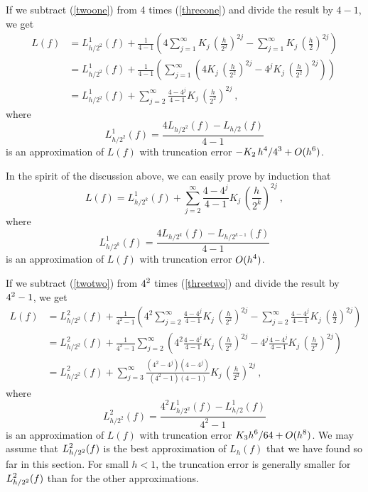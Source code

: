 If we subtract (\ref{twoone}) from 4 times (\ref{threeone}) and divide
the result by $4-1$, we get
\begin{align}
L(f) &= L_{h/2^2}^1(f) + \frac{1}{4-1}\left(
4 \sum_{j=1}^\infty K_j\,\left(\frac{h}{2^2}\right)^{2j}
- \sum_{j=1}^\infty K_j\,\left(\frac{h}{2}\right)^{2j}\right) \nonumber \\
&= L_{h/2^2}^1(f) + \frac{1}{4-1}\left(
\sum_{j=1}^\infty \left( 4 K_j\,\left(\frac{h}{2^2}\right)^{2j}
- 4^j K_j\,\left(\frac{h}{2^2}\right)^{2j}\right) \right) \nonumber \\
&= L_{h/2^2}^1(f) + \sum_{j=2}^\infty \frac{4 - 4^j}{4-1} K_j\,
\left(\frac{h}{2^2}\right)^{2j} \ ,  \label{threetwo}
\end{align}
where
\[
L_{h/2^2}^1(f) = \frac{4L_{h/2^2}(f)-L_{h/2}(f)}{4-1}
\]
is an approximation of $L(f)$ with truncation error
$\displaystyle - K_2\,h^4/4^3 + O(h^6)$.

In the spirit of the discussion above, we can easily prove by
induction that
\begin{equation} \label{ntwo}
L(f) = L_{h/2^k}^1(f) + \sum_{j=2}^\infty \frac{4 - 4^j}{4-1} K_j\,
\left(\frac{h}{2^k}\right)^{2j} \ ,
\end{equation}
where
\[
L_{h/2^k}^1(f) = \frac{4L_{h/2^k}(f)-L_{h/2^{k-1}}(f)}{4-1}
\]
is an approximation of $L(f)$ with truncation error $\displaystyle O(h^4)$.

If we subtract (\ref{twotwo}) from $\displaystyle 4^2$ times
(\ref{threetwo}) and divide the result by $\displaystyle 4^2-1$, we get
\begin{align}
L(f) &= L_{h/2^2}^2(f) + \frac{1}{4^2-1}\left(
4^2 \sum_{j=2}^\infty \frac{4 - 4^j}{4-1} K_j\,
\left(\frac{h}{2^2}\right)^{2j} -
\sum_{j=2}^\infty \frac{4 - 4^j}{4-1} K_j\,
\left(\frac{h}{2}\right)^{2j} \right) \nonumber \\
&= L_{h/2^2}^2(f) + \frac{1}{4^2-1} \sum_{j=2}^\infty \left(
4^2 \frac{4 - 4^j}{4-1} K_j\, \left(\frac{h}{2^2}\right)^{2j}
- 4^j \frac{4 - 4^j}{4-1} K_j\, \left(\frac{h}{2^2}\right)^{2j}
\right) \nonumber \\
&= L_{h/2^2}^2(f) + \sum_{j=3}^\infty
\frac{(4^2-4^j)(4-4^j)}{(4^2-1)(4-1)}
K_j\, \left(\frac{h}{2^2}\right)^{2j} \ ,  \label{threethree}
\end{align}
where
\[
L_{h/2^2}^2(f) = \frac{4^2L_{h/2^2}^1(f)
  -L_{h/2}^1(f)}{4^2-1}
\]
is an approximation of $L(f)$ with truncation error
$\displaystyle K_3 h^6/64 + O(h^8)$.  We may assume 
that $\displaystyle L_{h/2^2}^2(f)$ is the best approximation of
$L_h(f)$ that we have found so far in this section.  For small $h<1$,
the truncation error is generally smaller for
$\displaystyle L_{h/2^2}^2(f)$ than for the other
approximations.

